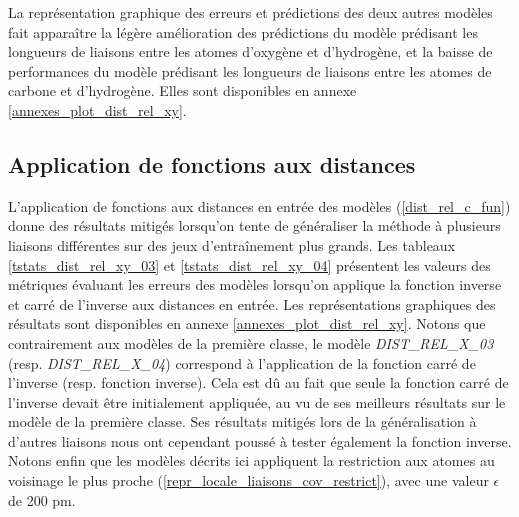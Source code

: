 \par La représentation graphique des erreurs et prédictions des deux autres modèles fait apparaître la légère amélioration des prédictions du modèle prédisant les longueurs de liaisons entre les atomes d'oxygène et d'hydrogène, et la baisse de performances du modèle prédisant les longueurs de liaisons entre les atomes de carbone et d'hydrogène. Elles sont disponibles en annexe \ref{annexes_plot_dist_rel_xy}.
	
\subsection{Application de fonctions aux distances}

\label{dist_rel_xy_fun}


\label{dist_rel_generalisation_fonctions}

\par L'application de fonctions aux distances en entrée des modèles (\ref{dist_rel_c_fun}) donne des résultats mitigés lorsqu'on tente de généraliser la méthode à plusieurs liaisons différentes sur des jeux d'entraînement plus grands. Les tableaux \ref{tstats_dist_rel_xy_03} et \ref{tstats_dist_rel_xy_04} présentent les valeurs des métriques évaluant les erreurs des modèles lorsqu'on applique la fonction inverse et carré de l'inverse aux distances en entrée. Les représentations graphiques des résultats sont disponibles en annexe \ref{annexes_plot_dist_rel_xy}. Notons que contrairement aux modèles de la première classe, le modèle \emph{DIST\_REL\_X\_03} (resp. \emph{DIST\_REL\_X\_04}) correspond à l'application de la fonction carré de l'inverse (resp. fonction inverse). Cela est dû au fait que seule la fonction carré de l'inverse devait être initialement appliquée, au vu de ses meilleurs résultats sur le modèle de la première classe. Ses résultats mitigés lors de la généralisation à d'autres liaisons nous ont cependant poussé à tester également la fonction inverse.\\
Notons enfin que les modèles décrits ici appliquent la restriction aux atomes au voisinage le plus proche (\ref{repr_locale_liaisons_cov_restrict}), avec une valeur $\epsilon$ de 200 pm.\\

